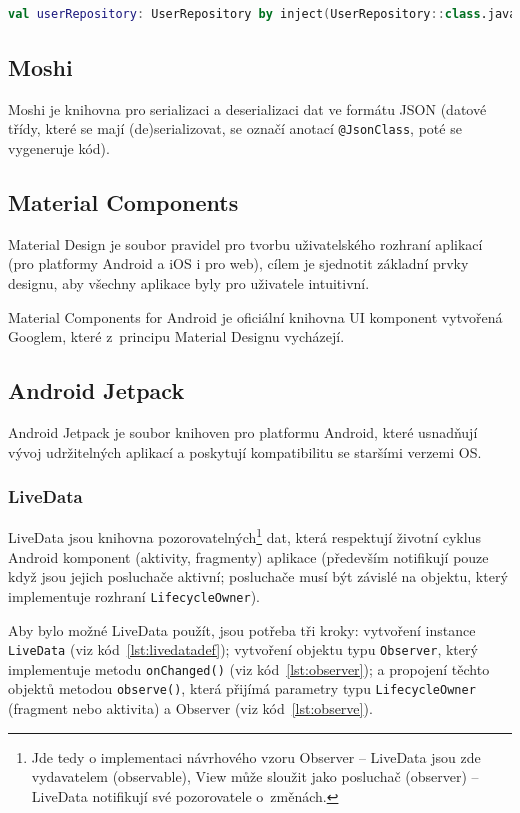 \documentclass[twoside]{ctuthesis}
\begin{document}
\begin{lstlisting}[language=Kotlin,caption={Vložení závislosti },label={lst:koinfield}]
val userRepository: UserRepository by inject(UserRepository::class.java)
\end{lstlisting}

\subsection{Moshi}

Moshi \cite{square2021moshi} je knihovna pro serializaci a deserializaci dat ve formátu JSON (datové třídy, které se mají (de)serializovat, se označí anotací \texttt{@JsonClass}, poté se vygeneruje kód).

\subsection{Material Components}
Material Design je soubor pravidel pro tvorbu uživatelského rozhraní aplikací (pro platformy Android a iOS i pro web), cílem je sjednotit základní prvky designu, aby všechny aplikace byly pro uživatele intuitivní. \cite{material2020introduction}

Material Components for Android \cite{material2020material} je oficiální knihovna UI komponent vytvořená Googlem, které z~principu Material Designu vycházejí.

\subsection{Android Jetpack}
Android Jetpack \cite{android2020jetpack} je soubor knihoven pro platformu Android, které usnadňují vývoj udržitelných aplikací a poskytují kompatibilitu se staršími verzemi OS.

\subsubsection{LiveData}
LiveData jsou knihovna pozorovatelných\footnote{Jde tedy o implementaci návrhového vzoru Observer -- LiveData jsou zde vydavatelem (observable), View může sloužit jako posluchač (observer) -- LiveData notifikují své pozorovatele o~změnách.} dat, která respektují životní cyklus Android komponent (aktivity, fragmenty) aplikace (především notifikují pouze když jsou jejich posluchače aktivní; posluchače musí být závislé na objektu, který implementuje rozhraní \texttt{LifecycleOwner}).

Aby bylo možné LiveData použít, jsou potřeba tři kroky: vytvoření instance \texttt{LiveData} (viz kód~\ref{lst:livedatadef}); vytvoření objektu typu \texttt{Observer}, který implementuje metodu \texttt{onChanged()} (viz kód~\ref{lst:observer}); a propojení těchto objektů metodou \texttt{observe()}, která přijímá parametry typu \texttt{LifecycleOwner} (fragment nebo aktivita) a Observer (viz kód~\ref{lst:observe}). \cite{android2020livedata}
\end{document}

